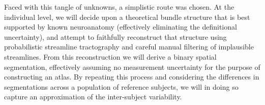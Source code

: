Faced with this tangle of unknowns, a simplistic route was chosen.
At the individual level, we will decide upon a theoretical bundle structure that is best supported by known neuroanatomy (effectively eliminating the definitional uncertainty), and attempt to faithfully reconstruct that structure using probabilistic streamline tractography and careful manual filtering of implausible streamlines.
From this reconstruction we will derive a binary spatial segmentation, effectively assuming no measurement uncertainty for the purpose of constructing an atlas. %
By repeating this process and considering the differences in segmentations across a population of reference subjects, we will in doing so capture an approximation of the inter-subject variability.

